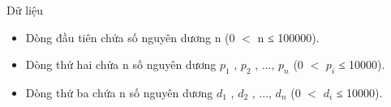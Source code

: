 Dữ liệu
\begin{itemize}
	\item     Dòng đầu tiên chứa số nguyên dương n (0 $<$ n ≤ 100000).   
	\item     Dòng thứ hai chứa n số nguyên dương $p_{1}$    , $p_{2}$    , ..., $p_{n}$    (0 $<$ $p_{i}$    ≤ 10000).   
	\item     Dòng thứ ba chứa n số nguyên dương $d_{1}$    , $d_{2}$    , ..., $d_{n}$    (0 $<$ $d_{i}$    ≤ 10000).   
\end{itemize}